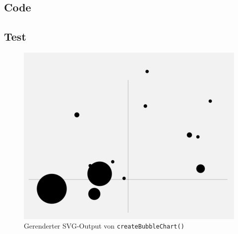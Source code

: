 \documentclass[german,notitlepage,smartquotes]{hgbreport}
\begin{document}
\subsection{Code}





















\clearpage

\subsection{Test}

\begin{figure}[h]
\centering
\includegraphics[width=.5\textwidth]{test-01}
\caption{Gerenderter SVG-Output von \texttt{createBubbleChart()}}
\label{fig:test-01}
\end{figure}
\end{document}
